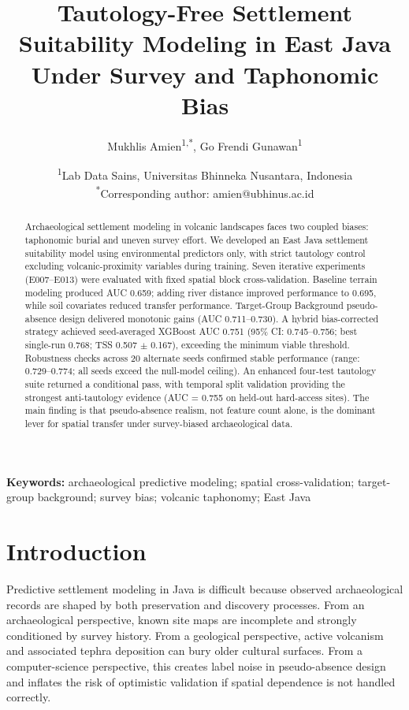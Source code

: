 \documentclass[12pt]{article}
\title{Tautology-Free Settlement Suitability Modeling in East Java Under Survey and Taphonomic Bias}
\author{Mukhlis Amien\textsuperscript{1,*}, Go Frendi Gunawan\textsuperscript{1}}
\date{%
\textsuperscript{1}Lab Data Sains, Universitas Bhinneka Nusantara, Indonesia\\
\textsuperscript{*}Corresponding author: amien@ubhinus.ac.id%
}
\begin{document}
\maketitle

\begin{abstract}
\noindent
Archaeological settlement modeling in volcanic landscapes faces two coupled biases: taphonomic burial and uneven survey effort.
We developed an East Java settlement suitability model using environmental predictors only, with strict tautology control excluding volcanic-proximity variables during training.
Seven iterative experiments (E007--E013) were evaluated with fixed spatial block cross-validation.
Baseline terrain modeling produced AUC 0.659; adding river distance improved performance to 0.695, while soil covariates reduced transfer performance.
Target-Group Background pseudo-absence design delivered monotonic gains (AUC 0.711--0.730).
A hybrid bias-corrected strategy achieved seed-averaged XGBoost AUC 0.751 (95\% CI: 0.745--0.756; best single-run 0.768; TSS 0.507 $\pm$ 0.167), exceeding the minimum viable threshold.
Robustness checks across 20 alternate seeds confirmed stable performance (range: 0.729--0.774; all seeds exceed the null-model ceiling).
An enhanced four-test tautology suite returned a conditional pass, with temporal split validation providing the strongest anti-tautology evidence (AUC = 0.755 on held-out hard-access sites).
The main finding is that pseudo-absence realism, not feature count alone, is the dominant lever for spatial transfer under survey-biased archaeological data.
\end{abstract}

\noindent\textbf{Keywords:} archaeological predictive modeling; spatial cross-validation; target-group background; survey bias; volcanic taphonomy; East Java

\section{Introduction}

Predictive settlement modeling in Java is difficult because observed archaeological records are shaped by both preservation and discovery processes.
From an archaeological perspective, known site maps are incomplete and strongly conditioned by survey history.
From a geological perspective, active volcanism and associated tephra deposition can bury older cultural surfaces.
From a computer-science perspective, this creates label noise in pseudo-absence design and inflates the risk of optimistic validation if spatial dependence is not handled correctly.
\end{document}
